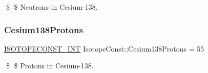 \$ \$ Neutrons in Cesium-\/138. \mbox{\label{group___isotope_const-_cesium-_cs138_gacf1018c057eafbfdc3b8d587293444b3}} 
\subsubsection{\texorpdfstring{Cesium138\+Protons}{Cesium138Protons}}
{\footnotesize\ttfamily \mbox{\hyperlink{group___isotope_const-_macros_ga5f18360b3e99483a35c32d789e62621c}{I\+S\+O\+T\+O\+P\+E\+C\+O\+N\+S\+T\+\_\+\+I\+NT}} Isotope\+Const\+::\+Cesium138\+Protons = 55}

\$ \$ Protons in Cesium-\/138. 